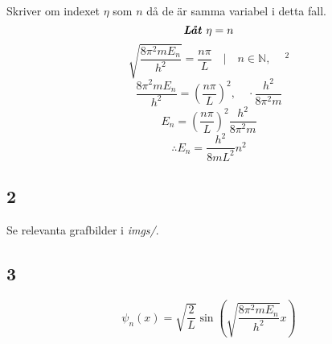 \documentclass{article}
\begin{document}
Skriver om indexet $\eta$ som $n$ då de är samma variabel i detta fall. 
$$
\textbf{\emph{Låt $\eta = n$}}
$$
$$
\sqrt{\frac{8 \pi^2 m E_n}{h^2}} = \frac{n\pi}{L} \quad | \quad n \in \mathbb{N}, \quad \ ^2
$$
$$
\frac{8 \pi^2 m E_n}{h^2} = \left(\frac{n\pi}{L}\right)^2, \quad \cdot \frac{h^2}{8 \pi^2 m}
$$
$$
E_n = \left(\frac{n\pi}{L}\right)^2 \frac{h^2}{8 \pi^2 m} 
$$
\begin{equation} \label{energy_n}
\therefore E_n = \frac{h^2}{8mL^2} n^2
\end{equation}

\subsection{2}
Se relevanta grafbilder i \emph{imgs/}.

\subsection{3}

$$
\psi_n(x) = \sqrt{ \frac{2}{L} } \sin \left( \sqrt{\frac{8 \pi^2 m E_n}{h^2}} x \right)
$$
\end{document}
